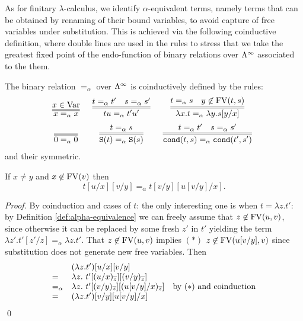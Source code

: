 As for finitary $\lambda$-calculus, we identify $\alpha$-equivalent terms, namely terms that can be obtained by renaming of their bound variables, to avoid capture of free variables under substitution. This is achieved via the following coinductive definition, where double lines are used in the rules to stress that we take the greatest fixed point of the endo-function of binary relations over $\Lambda^\infty$ associated to the them.

\begin{definition}\label{def:alpha-equivalence}
The binary relation $=_\alpha$ over $\Lambda^\infty$ is coinductively defined by the rules:
\[\begin{array}{ccc}
 \infer=[]{x =_\alpha x}{x \in \Var} &
 \infer=[]{tu =_\alpha t'u'}{t =_\alpha t' \quad s =_\alpha s'} &
 \infer=[]{\lambda x.t =_\alpha \lambda y. s[y/x]}{t =_\alpha s \quad y \not \in \FV(t,s)} \\[2mm]
 \infer=[]{0 =_\alpha 0}{} & 
 \infer=[]{\Succ(t) =_\alpha \Succ(s)}{t =_\alpha s} &
 \infer=[]{\cond(t, s) =_\alpha \cond(t', s')}{t =_\alpha t' \quad s =_\alpha s'}
\end{array}\]
and their symmetric.
\end{definition}

\vspace{1mm}
\begin{lemma}\label{lem:substitution-composition} 
If $x\neq y$ and $x \not \in {{\rm FV}}(v)$ then 
\[t[u/x][v/y] =_\alpha t[v/y][u[v/y]/x].\]
\end{lemma}

\begin{proof} By coinduction and cases of $t$: the only interesting one is when
$t = \lambda z.t'$: by Definition \ref{def:alpha-equivalence} we can freely assume
that $z \not\in {{\rm FV}}(u,v)$, since otherwise it can be replaced by some fresh $z'$ in $t'$ yielding
the term $\lambda z'.t'[z'/z] =_\alpha \lambda z.t'$. That $z \not\in {{\rm FV}}(u,v)$ implies 
$(*)$ $z \not\in {{\rm FV}}(u[v/y],v)$ since substitution
does not generate new free variables. Then
\[\begin{array}{lll}
& (\lambda z.t') [u/x][v/y] \\
= & \lambda z. \ t' [(u/x)_{\overline{z}}][(v/y)_{\overline{z}}] \\
=_\alpha & \lambda z. \ t' [(v/y)_{\overline{z}}] [(u[v/y]/x)_{\overline{z}}] & \mbox{by $(*)$ and coinduction} \\
= &  (\lambda z.t') [v/y][u[v/y]/x]
\end{array}\]
\qed
\end{proof}

